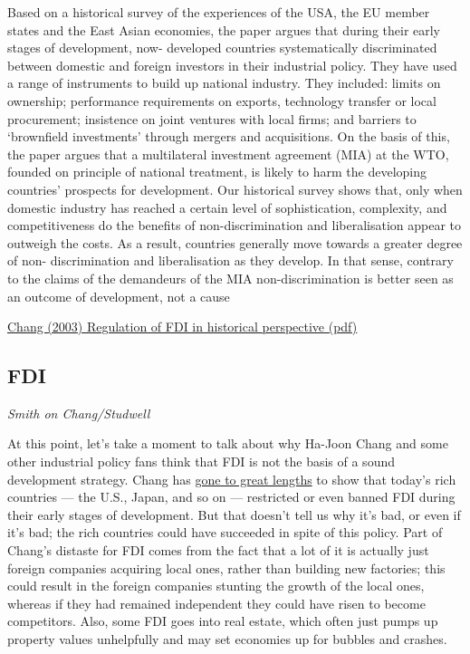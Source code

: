\documentclass[
]{book}
\begin{document}
Based on a historical survey of the experiences of the USA, the EU member states and the East
Asian economies, the paper argues that during their early stages of development, now-
developed countries systematically discriminated between domestic and foreign investors in
their industrial policy. They have used a range of instruments to build up national industry.
They included: limits on ownership; performance requirements on exports, technology transfer
or local procurement; insistence on joint ventures with local firms; and barriers to `brownfield
investments' through mergers and acquisitions. On the basis of this, the paper argues that a
multilateral investment agreement (MIA) at the WTO, founded on principle of national
treatment, is likely to harm the developing countries' prospects for development. Our historical
survey shows that, only when domestic industry has reached a certain level of sophistication,
complexity, and competitiveness do the benefits of non-discrimination and liberalisation appear
to outweigh the costs. As a result, countries generally move towards a greater degree of non-
discrimination and liberalisation as they develop. In that sense, contrary to the claims of the
demandeurs of the MIA non-discrimination is better seen as an outcome of development, not a
cause

\href{pdf//home/jmh/zdocs/Writings/Ha-Joon_Chang/Chang_2003_Regulation_of_FDI.pdf}{Chang (2003) Regulation of FDI in historical perspective (pdf)}

\hypertarget{fdi}{%
\subsection{FDI}\label{fdi}}

\emph{Smith on Chang/Studwell}

At this point, let's take a moment to talk about why Ha-Joon Chang and some other industrial policy fans think that FDI is not the basis of a sound development strategy. Chang has \href{https://econpapers.repec.org/paper/unmunuint/200312.htm}{gone to great lengths} to show that today's rich countries --- the U.S., Japan, and so on --- restricted or even banned FDI during their early stages of development. But that doesn't tell us why it's bad, or even if it's bad; the rich countries could have succeeded in spite of this policy. Part of Chang's distaste for FDI comes from the fact that a lot of it is actually just foreign companies acquiring local ones, rather than building new factories; this could result in the foreign companies stunting the growth of the local ones, whereas if they had remained independent they could have risen to become competitors. Also, some FDI goes into real estate, which often just pumps up property values unhelpfully and may set economies up for bubbles and crashes.
\end{document}
